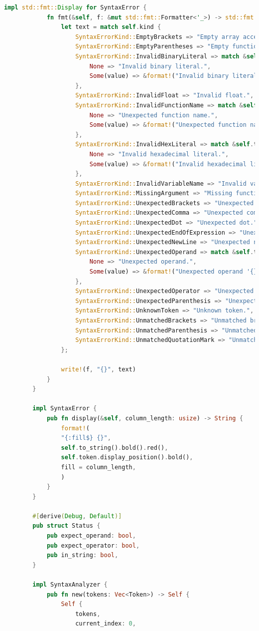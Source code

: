 \documentclass[14pt, a4paper]{extreport}
\begin{document}
\begin{lstlisting}[language=Rust]
		impl std::fmt::Display for SyntaxError {
			fn fmt(&self, f: &mut std::fmt::Formatter<'_>) -> std::fmt::Result {
				let text = match self.kind {
					SyntaxErrorKind::EmptyBrackets => "Empty array access.",
					SyntaxErrorKind::EmptyParentheses => "Empty function or grouping.",
					SyntaxErrorKind::InvalidBinaryLiteral => match &self.token.value {
						None => "Invalid binary literal.",
						Some(value) => &format!("Invalid binary literal '0{}'.", value),
					},
					SyntaxErrorKind::InvalidFloat => "Invalid float.",
					SyntaxErrorKind::InvalidFunctionName => match &self.token.value {
						None => "Unexpected function name.",
						Some(value) => &format!("Unexpected function name '{}'.", value),
					},
					SyntaxErrorKind::InvalidHexLiteral => match &self.token.value {
						None => "Invalid hexadecimal literal.",
						Some(value) => &format!("Invalid hexadecimal literal '0{}'.", value),
					},
					SyntaxErrorKind::InvalidVariableName => "Invalid variable name.",
					SyntaxErrorKind::MissingArgument => "Missing function argument.",
					SyntaxErrorKind::UnexpectedBrackets => "Unexpected brackets.",
					SyntaxErrorKind::UnexpectedComma => "Unexpected comma.",
					SyntaxErrorKind::UnexpectedDot => "Unexpected dot.",
					SyntaxErrorKind::UnexpectedEndOfExpression => "Unexpected end of expression.",
					SyntaxErrorKind::UnexpectedNewLine => "Unexpected newline.",
					SyntaxErrorKind::UnexpectedOperand => match &self.token.value {
						None => "Unexpected operand.",
						Some(value) => &format!("Unexpected operand '{}'.", value),
					},
					SyntaxErrorKind::UnexpectedOperator => "Unexpected operator.",
					SyntaxErrorKind::UnexpectedParenthesis => "Unexpected parenthesis.",
					SyntaxErrorKind::UnknownToken => "Unknown token.",
					SyntaxErrorKind::UnmatchedBrackets => "Unmatched brackets.",
					SyntaxErrorKind::UnmatchedParenthesis => "Unmatched parenthesis.",
					SyntaxErrorKind::UnmatchedQuotationMark => "Unmatched quotation mark.",
				};
				
				write!(f, "{}", text)
			}
		}
		
		impl SyntaxError {
			pub fn display(&self, column_length: usize) -> String {
				format!(
				"{:fill$} {}",
				self.to_string().bold().red(),
				self.token.display_position().bold(),
				fill = column_length,
				)
			}
		}
		
		#[derive(Debug, Default)]
		pub struct Status {
			pub expect_operand: bool,
			pub expect_operator: bool,
			pub in_string: bool,
		}
		
		impl SyntaxAnalyzer {
			pub fn new(tokens: Vec<Token>) -> Self {
				Self {
					tokens,
					current_index: 0,
					

\end{lstlisting}
\end{document}
